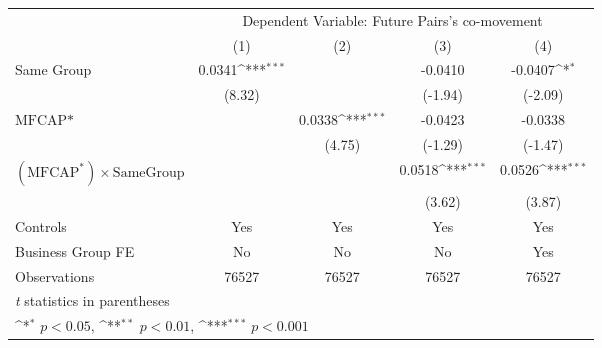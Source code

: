 {
\def\sym#1{\ifmmode^{#1}\else\(^{#1}\)\fi}
\begin{tabular}{l*{4}{c}}
\hline\hline
                &\multicolumn{4}{c}{Dependent Variable:  Future Pairs's co-movement}        \\\cmidrule(lr){2-5}
                &\multicolumn{1}{c}{(1)}         &\multicolumn{1}{c}{(2)}         &\multicolumn{1}{c}{(3)}         &\multicolumn{1}{c}{(4)}         \\
\hline
Same Group      &   0.0341\sym{***}&                  &  -0.0410         &  -0.0407\sym{*}  \\
                &   (8.32)         &                  &  (-1.94)         &  (-2.09)         \\
[1em]
$ \text{MFCAP*} $&                  &   0.0338\sym{***}&  -0.0423         &  -0.0338         \\
                &                  &   (4.75)         &  (-1.29)         &  (-1.47)         \\
[1em]
 $ (\text{MFCAP}^*) \times {\text{SameGroup} }  $ &                  &                  &   0.0518\sym{***}&   0.0526\sym{***}\\
                &                  &                  &   (3.62)         &   (3.87)         \\
\hline
Controls        &      Yes         &      Yes         &      Yes         &      Yes         \\
Business Group FE&       No         &       No         &       No         &      Yes         \\
Observations    &    76527         &    76527         &    76527         &    76527         \\
\hline\hline
\multicolumn{5}{l}{\footnotesize \textit{t} statistics in parentheses}\\
\multicolumn{5}{l}{\footnotesize \sym{*} \(p<0.05\), \sym{**} \(p<0.01\), \sym{***} \(p<0.001\)}\\
\end{tabular}
}
